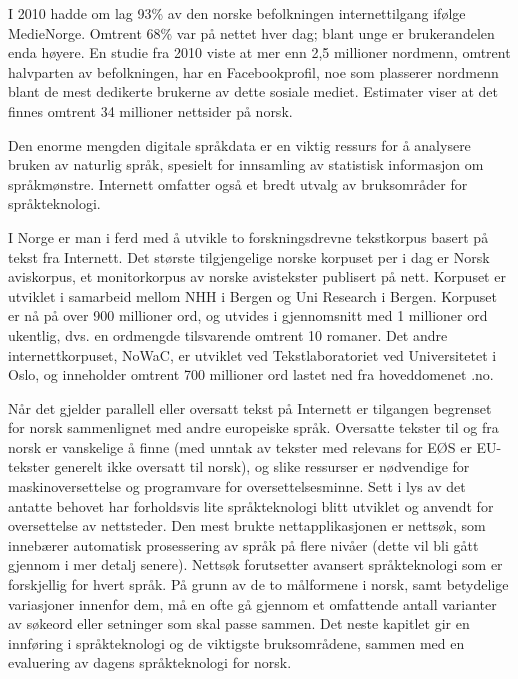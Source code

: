 \begin{multicols}{2}
I 2010 hadde om lag 93\% av den norske befolkningen internettilgang ifølge MedieNorge. 
Omtrent 68\% var på nettet hver dag; blant unge er brukerandelen enda høyere. 
En studie fra 2010 viste at mer enn 2,5 millioner nordmenn, omtrent halvparten av befolkningen, har en Facebookprofil, noe som plasserer nordmenn blant de mest dedikerte brukerne av dette sosiale mediet. 
Estimater viser at det finnes omtrent 34 millioner nettsider på norsk. 


Den enorme mengden digitale språkdata er en viktig ressurs for å analysere bruken av naturlig språk, spesielt for innsamling av statistisk informasjon om språkmønstre. Internett omfatter også et bredt utvalg av bruksområder for språkteknologi.

I Norge er man i ferd med å utvikle to forskningsdrevne tekstkorpus basert på tekst fra Internett. 
Det største tilgjengelige norske korpuset per i dag er Norsk aviskorpus, et monitorkorpus av norske avistekster publisert på nett.
Korpuset er utviklet i samarbeid mellom NHH i Bergen og Uni Research i Bergen. Korpuset er nå på over 900 millioner ord, og utvides i gjennomsnitt med 1 millioner ord ukentlig, dvs. en ordmengde tilsvarende omtrent 10 romaner.  
Det andre internettkorpuset, NoWaC, er utviklet ved Tekstlaboratoriet ved Universitetet i Oslo, og inneholder omtrent 700 millioner ord lastet ned fra hoveddomenet .no. 

Når det gjelder parallell eller oversatt tekst på Internett er tilgangen begrenset for norsk sammenlignet med andre europeiske språk. 
Oversatte tekster til og fra norsk er vanskelige å finne (med unntak av tekster med relevans for EØS er EU-tekster generelt ikke oversatt til norsk), og slike ressurser er nødvendige for maskinoversettelse og programvare for oversettelsesminne. 
Sett i lys av det antatte behovet har forholdsvis lite språkteknologi blitt utviklet og anvendt for oversettelse av nettsteder.
Den mest brukte nettapplikasjonen er nettsøk, som innebærer automatisk prosessering av språk på flere nivåer (dette vil bli gått gjennom i mer detalj senere). Nettsøk forutsetter avansert språkteknologi som er forskjellig for hvert språk. 
På grunn av de to målformene i norsk, samt betydelige variasjoner innenfor dem, må en ofte gå gjennom et omfattende antall varianter av søkeord eller setninger som skal passe sammen.
Det neste kapitlet gir en innføring i språkteknologi og de viktigste bruksområdene, sammen med en evaluering av dagens språkteknologi for norsk.

\end{multicols}


